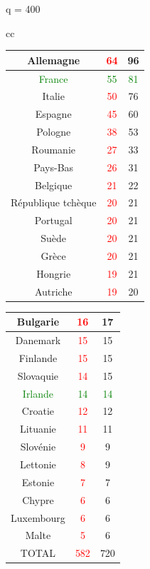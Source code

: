 \documentclass[11pt]{beamer}
\begin{document}
	\begin{frame}
		\begin{center}
			q = 400
		\end{center}
		\begin{tabular}{cc}
			\begin{tabular}{|c|c|c|}
				\hline Allemagne & \textcolor{red}{64} & 96 \\
				\hline \textcolor{green}{France} & \textcolor{green}{55} & \textcolor{green}{81} \\
				\hline Italie & \textcolor{red}{50} & 76 \\
				\hline Espagne & \textcolor{red}{45} & 60 \\
				\hline Pologne & \textcolor{red}{38} & 53 \\
				\hline Roumanie & \textcolor{red}{27} & 33 \\
				\hline Pays-Bas & \textcolor{red}{26} & 31 \\
				\hline Belgique & \textcolor{red}{21} & 22 \\
				\hline République tchèque & \textcolor{red}{20} & 21 \\
				\hline Portugal & \textcolor{red}{20} & 21 \\
				\hline Suède & \textcolor{red}{20} & 21 \\
				\hline Grèce & \textcolor{red}{20} & 21 \\
				\hline Hongrie & \textcolor{red}{19} & 21 \\
				\hline Autriche & \textcolor{red}{19} & 20 \\
				\hline
			\end{tabular}
			\begin{tabular}{|c|c|c|}
				\hline Bulgarie & \textcolor{red}{16} & 17 \\
				\hline Danemark & \textcolor{red}{15} & 15 \\
				\hline Finlande & \textcolor{red}{15} & 15 \\
				\hline Slovaquie & \textcolor{red}{14} & 15 \\
				\hline \textcolor{green}{Irlande} & \textcolor{green}{14} & \textcolor{green}{14} \\
				\hline Croatie & \textcolor{red}{12} & 12 \\
				\hline Lituanie & \textcolor{red}{11} & 11 \\
				\hline Slovénie & \textcolor{red}{9} & 9 \\
				\hline Lettonie & \textcolor{red}{8} & 9 \\
				\hline Estonie & \textcolor{red}{7} & 7 \\
				\hline Chypre & \textcolor{red}{6} & 6 \\
				\hline Luxembourg & \textcolor{red}{6} & 6 \\
				\hline Malte & \textcolor{red}{5} & 6 \\
				\hline TOTAL & \textcolor{red}{582} & 720 \\
				\hline
			\end{tabular}
		\end{tabular}
	\end{frame}
	
\end{document}

